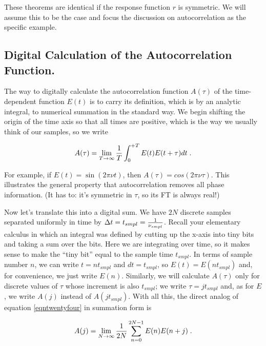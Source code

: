\documentclass[11pt,preprint]{aastex}
\begin{document}
	These theorems are identical if the response function $r$ is
symmetric. We will assume this to be the case and focus the discussion
on autocorrelation as the specific example.

\subsection{Digital Calculation of the Autocorrelation Function.} 

\label{elevenpone}

	The way to digitally calculate the autocorrelation function
$A(\tau)$ of the time-dependent function $E(t)$ is to carry its
definition, which is by an analytic integral, to numerical summation in
the standard way.  We begin shifting the origin of the time axis so that
all times are positive, which is the way we usually think of our
samples, so we write

\begin{equation} \label{eqntwentyfour}
A(\tau) = \lim_{T \to \infty} {1 \over T}
\int_0^{+T} E(t) E(t + \tau) dt \; .
\end{equation}

\noindent For example, if $E(t) = \sin( 2 \pi \nu t)$, then $A(\tau) =
cos(2 \pi \nu \tau)$. This illustrates the general property that
autocorrelation removes all phase information. (It has to: it's
symmetric in $\tau$, so its FT is always real!)

        Now let's translate this into a digital sum.  We have $2N$
discrete samples separated uniformly in time by $\Delta t = t_{smpl} = 
{1 \over \nu_{smpl}}$.  Recall your elementary calculus in which an    
integral was defined by cutting up the x-axis into tiny bits and taking
a sum over the bits.  Here we are integrating over time, so it makes   
sense to make the ``tiny bit'' equal to the sample time $t_{smpl}$.  In
terms of sample number $n$, we can write $t = nt_{smpl}$ and $dt =
t_{smpl}$, so $E(t) = E(nt_{smpl})$ and, for convenience, we just write 
$E(n)$.  Similarly, we will calculate $A(\tau)$ only for discrete values
of $\tau$ whose increment is also $t_{smpl}$; we write $\tau = j
t_{smpl}$ and, as for $E$, we write $A(j)$ instead of $A(jt_{smpl})$.
With all this, the direct analog of equation \ref{eqntwentyfour} in
summation form is

\begin{equation}
A(j) = \lim_{N \to \infty} {1 \over 2N}
\sum_{n=0}^{2N-1} E(n) E(n + j) \; .
\end{equation}
\end{document}
